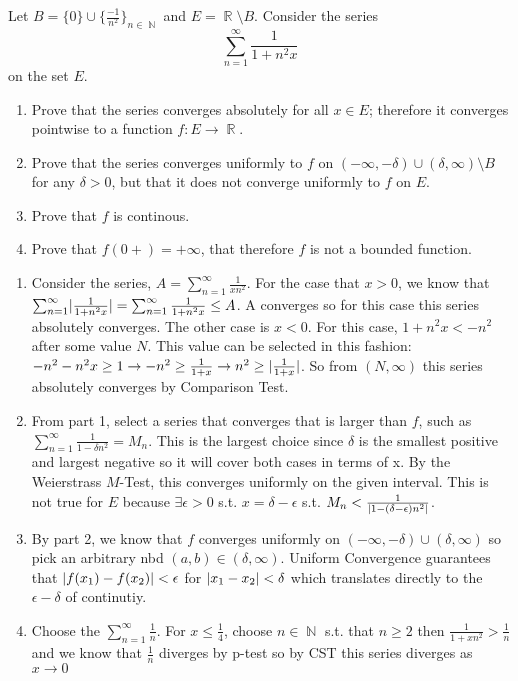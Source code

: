 \documentclass[12pt,letterpaper,boxed]{hmcpset}
\DeclareMathOperator{\N}{\mathbb{N}}
\DeclareMathOperator{\R}{\mathbb{R}}
\DeclarePairedDelimiter\abs{\lvert}{\rvert}%
\begin{document}

\begin{problem}[Exercise 4.3]
Let $B = \{0\}\cup \{\frac{-1}{n^{2}}\}_{n\in\N}$ and $E=\R\setminus B.$ Consider the series $$\sum_{n=1}^{\infty} \frac{1}{1 + n^{2}x}$$ on the set $E$.
\begin{enumerate}
    \item Prove that the series converges absolutely for all $x \in E$; therefore it converges pointwise to a function $f : E\rightarrow \R$.
    \item Prove that the series converges uniformly to $f$ on $(-\infty, -\delta) \cup (\delta, \infty)\setminus B$ for any $\delta > 0$, but that it does not converge uniformly to $f$ on $E$.
    \item Prove that $f$ is continous. 
    \item Prove that $f(0+) = +\infty$, that therefore $f$ is not a bounded function.
\end{enumerate}
\end{problem}

\begin{solution}
\begin{enumerate}
    \item Consider the series, $A=\sum_{n=1}^{\infty} \frac{1}{xn^{2}}$. For the case that $x > 0$, we know that $\sum_{n=1}^{\infty} \abs{\frac{1}{1 + n^{2}x}}= \sum_{n=1}^{\infty} \frac{1}{1 + n^{2}x} \leq A$. A converges so for this case this series absolutely converges. The other case is $x < 0$. For this case, $1 + n^{2}x < -n^{2}$ after some value $N$. This value can be selected in this fashion: $-n^{2}-n^{2}x \ge 1 \rightarrow -n^{2} \ge \frac{1}{1 + x} \rightarrow n^{2} \ge \abs{\frac{1}{1 + x}}$. So from  $(N, \infty)$ this series absolutely converges by Comparison Test.
    \item From part 1, select a series that converges that is larger than $f$, such as $\sum_{n=1}^{\infty} \frac{1}{1 - \delta n^{2}}= M_n$. This is the largest choice since $\delta$ is the smallest positive and largest negative so it will cover both cases in terms of x. By the Weierstrass $M$-Test, this converges uniformly on the given interval. This is not true for $E$ because $\exists \epsilon > 0$ s.t. $x=\delta - \epsilon$ s.t. $M_n < \frac{1}{\abs{1 - (\delta - \epsilon)n^{2}}}$.
    \item By part 2, we know that $f$ converges uniformly on $(-\infty, -\delta)\cup(\delta, \infty)$ so pick an arbitrary nbd $(a,b) \in (\delta, \infty).$ Uniform Convergence guarantees that $\abs{f(x_1) - f(x_2)} < \epsilon$ for $\abs{x_1 - x_2} <\delta$ which translates directly to the $\epsilon - \delta$ of continutiy. 
    \item Choose the $\sum_{n =1}^{\infty}\frac{1}{n}$. For $x \leq \frac{1}{4}$, choose $n\in\N$ s.t. that $n \ge 2$ then $\frac{1}{1 + xn^{2}} > \frac{1}{n}$ and we know that $\frac{1}{n}$ diverges by p-test so by CST this series diverges as $x\rightarrow0$
\end{enumerate}
\end{solution}
\end{document}
